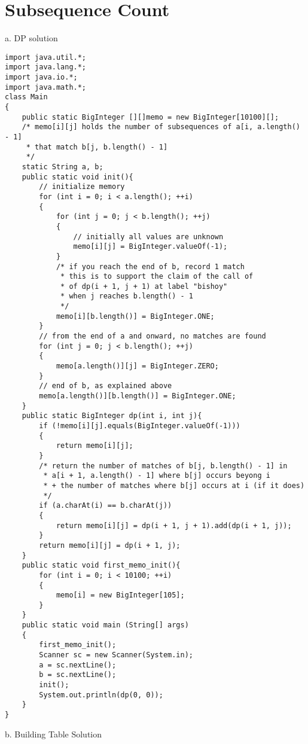\documentclass[12pt]{book}
\begin{document}
\section{Subsequence Count}
a. DP solution
\begin{verbatim}
import java.util.*;
import java.lang.*;
import java.io.*;
import java.math.*;
class Main
{
	public static BigInteger [][]memo = new BigInteger[10100][];
	/* memo[i][j] holds the number of subsequences of a[i, a.length() - 1]
	 * that match b[j, b.length() - 1]
	 */
	static String a, b;
	public static void init(){
		// initialize memory
		for (int i = 0; i < a.length(); ++i)
		{
			for (int j = 0; j < b.length(); ++j)
			{
				// initially all values are unknown
				memo[i][j] = BigInteger.valueOf(-1);
			}
			/* if you reach the end of b, record 1 match
			 * this is to support the claim of the call of
			 * of dp(i + 1, j + 1) at label "bishoy"
			 * when j reaches b.length() - 1
			 */
			memo[i][b.length()] = BigInteger.ONE;
		}
		// from the end of a and onward, no matches are found
		for (int j = 0; j < b.length(); ++j)
		{
			memo[a.length()][j] = BigInteger.ZERO;
		}
		// end of b, as explained above
		memo[a.length()][b.length()] = BigInteger.ONE;
	}
	public static BigInteger dp(int i, int j){
		if (!memo[i][j].equals(BigInteger.valueOf(-1)))
		{
			return memo[i][j];
		}
		/* return the number of matches of b[j, b.length() - 1] in
		 * a[i + 1, a.length() - 1] where b[j] occurs beyong i
		 * + the number of matches where b[j] occurs at i (if it does)
		 */
		if (a.charAt(i) == b.charAt(j))
		{
			return memo[i][j] = dp(i + 1, j + 1).add(dp(i + 1, j));
		}
		return memo[i][j] = dp(i + 1, j);
	}
	public static void first_memo_init(){
		for (int i = 0; i < 10100; ++i)
		{
			memo[i] = new BigInteger[105];
		}
	}
	public static void main (String[] args)
	{
		first_memo_init();
		Scanner sc = new Scanner(System.in);
		a = sc.nextLine();
		b = sc.nextLine();
		init();
		System.out.println(dp(0, 0));
	}
}
\end{verbatim}
b. Building Table Solution
\end{document}
